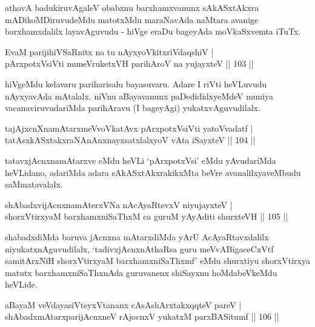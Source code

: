 \begin{artha}
athavA badukiruvAgaleV obabxnu barxhamxvanunx sAkASxtAkxra mADikoMDiruvudeMdu matotxMdu maraNavAda naMtara avanige barxhamxdalilx layavAguvudu - hiVge eraDu bageyAda moVkaSxvemta iTuTx.
\end{artha}

\begin{shl}
EvaM parijihiVSaRnitx na tu nAyxyoVkitxriVdaqshiV |\\
pArxpotxV\s siVti muneVruketxVH parihAroV na yujayxteV \hfill || 103 || 
\end{shl}

\begin{artha}
hiVgeMdu kelavaru pariharisalu bayasuvaru. Adare I riVti heVLuvudu nAyxyavAda mAtalalx. niVnu aBayavanunx paDedididxyeMdeV muniya vacanaviruvudariMda parihAravu (I bageyAgi) yukatxvAguvudilalx.
\end{artha}


\begin{shl}
tajAjxcnXnamAtarxmeVvoVkatAvx pArxpotxV\s siVti yatoV\s vadatf |\\
tatAsxkASxtakxraNAnAnxnayxsatxlalxyoV vA\s ta iSayxteV \hfill || 104 || 
\end{shl}

\begin{artha}
tatavxjAcnxnamAtarxve eMdu heVLi `pArxpotxVsi' eMdu yAvudariMda heVLidano, adariMda adara sAkASxtAkxrakikxMta beVre avanalilxyaveMbudu saMmatavalalx.
\end{artha}

\begin{shl}
shAbadxvijAcnxnamAterxVNa nA\s \s cAyaRtevxV niyujayxteV |\\
shorxVtirxyaM barxhamxniSaThxM ca guruM yAyAditi shurxteVH \hfill || 105 || 
\end{shl}

\begin{artha}
shabadxdiMda baruva jAcnxna mAtarxdiMda yArU AcAyaRtavxdalilx niyukatxnAguvudilalx, `tadivxjAcnxnAthaRsa guru meVvABigaceCxVtf samitArxNiH shorxVtirxyaM barxhamxniSaThxmf' eMdu shurxtiyu shorxVtirxya matutx barxhamxniSaThxnAda guruvanenx shiSayxnu hoMdabeVkeMdu heVLide.
\end{artha}

\begin{shl}
aBayaM veVdayasiVteyxVtananx cAsAshArxtakxqqteV pareV |\\
shAbadxmAtarxparijAcnxneV rAjocnxV yukatxM parxBASitumf \hfill || 106 || 
\end{shl}

